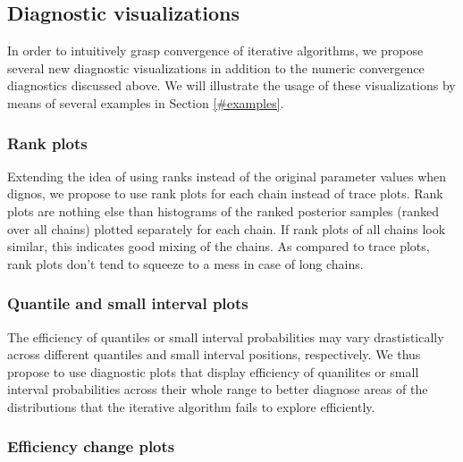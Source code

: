 \documentclass[american,]{article}
\begin{document}
\hypertarget{diagnostic-visualizations}{%
\subsection{Diagnostic visualizations}\label{diagnostic-visualizations}}

In order to intuitively grasp convergence of iterative algorithms, we
propose several new diagnostic visualizations in addition to the numeric
convergence diagnostics discussed above. We will illustrate the usage of
these visualizations by means of several examples in Section
\ref{#examples}.

\hypertarget{rank-plots}{%
\subsubsection{Rank plots}\label{rank-plots}}

Extending the idea of using ranks instead of the original parameter
values when dignos, we propose to use rank plots for each chain instead
of trace plots. Rank plots are nothing else than histograms of the
ranked posterior samples (ranked over all chains) plotted separately for
each chain. If rank plots of all chains look similar, this indicates
good mixing of the chains. As compared to trace plots, rank plots don't
tend to squeeze to a mess in case of long chains.

\hypertarget{quantile-and-small-interval-plots}{%
\subsubsection{Quantile and small interval
plots}\label{quantile-and-small-interval-plots}}

The efficiency of quantiles or small interval probabilities may vary
drastistically across different quantiles and small interval positions,
respectively. We thus propose to use diagnostic plots that display
efficiency of quanilites or small interval probabilities across their
whole range to better diagnose areas of the distributions that the
iterative algorithm fails to explore efficiently.

\hypertarget{efficiency-change-plots}{%
\subsubsection{Efficiency change plots}\label{efficiency-change-plots}}
\end{document}
